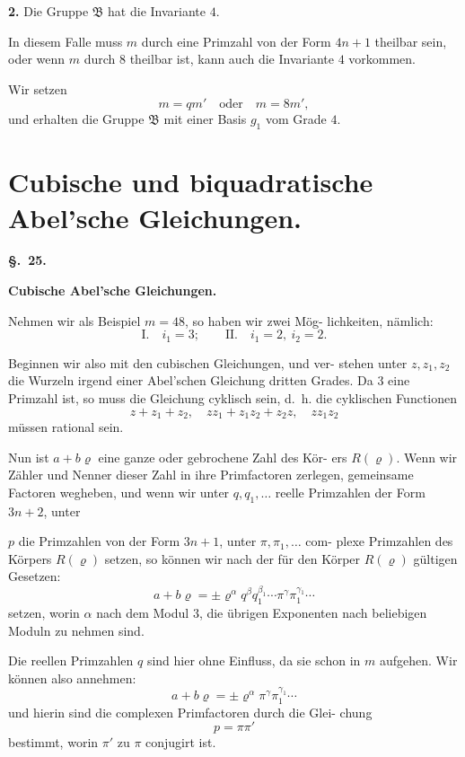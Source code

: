 \documentclass[12pt,a4paper]{article}
\begin{document}
\medskip
\noindent\textbf{2.} Die Gruppe $\mathfrak{B}$ hat die Invariante $4$.

In diesem Falle muss $m$ durch eine Primzahl von der Form
$4n+1$ theilbar sein, oder wenn $m$ durch $8$ theilbar ist,
kann auch die Invariante $4$ vorkommen.

Wir setzen
\[m = qm'\quad \text{oder}\quad m = 8m',\]
und erhalten die Gruppe $\mathfrak{B}$ mit einer Basis $g_1$ vom Grade $4$.

\newpage
\section{Cubische und biquadratische Abel'sche Gleichungen.}
\label{sec:25}

\begin{center}\textbf{\S.~25.}\end{center}
\begin{center}\large\bfseries Cubische Abel'sche Gleichungen.\end{center}

Nehmen wir als Beispiel $m = 48$, so haben wir zwei M\"og-
lichkeiten, n\"amlich:
\[\text{I.}\quad i_1 = 3;\qquad \text{II.}\quad i_1 = 2,\ i_2 = 2.\]

Beginnen wir also mit den cubischen Gleichungen, und ver-
stehen unter $z, z_1, z_2$ die Wurzeln irgend einer Abel'schen
Gleichung dritten Grades. Da $3$ eine Primzahl ist, so muss die
Gleichung cyklisch sein, d.~h. die cyklischen Functionen
\[z + z_1 + z_2,\quad zz_1 + z_1z_2 + z_2z,\quad zz_1z_2\]
m\"ussen rational sein.

Nun ist $a + b\varrho$ eine ganze oder gebrochene Zahl des K\"or-
ers $R(\varrho)$. Wenn wir Z\"ahler und Nenner dieser Zahl in ihre
Primfactoren zerlegen, gemeinsame Factoren wegheben, und wenn
wir unter $q, q_1, \ldots$ reelle Primzahlen der Form $3n+2$, unter

$p$ die Primzahlen von der Form $3n+1$, unter $\pi, \pi_1, \ldots$ com-
plexe Primzahlen des K\"orpers $R(\varrho)$ setzen, so k\"onnen wir nach
der f\"ur den K\"orper $R(\varrho)$ g\"ultigen Gesetzen:
\[a + b\varrho = \pm \varrho^\alpha q^{\beta} q_1^{\beta_1} \cdots \pi^\gamma \pi_1^{\gamma_1} \cdots\]
setzen, worin $\alpha$ nach dem Modul $3$, die \"ubrigen Exponenten nach
beliebigen Moduln zu nehmen sind.

Die reellen Primzahlen $q$ sind hier ohne Einfluss, da sie
schon in $m$ aufgehen. Wir k\"onnen also annehmen:
\[a + b\varrho = \pm \varrho^\alpha \pi^\gamma \pi_1^{\gamma_1} \cdots\]
und hierin sind die complexen Primfactoren durch die Glei-
chung
\[p = \pi \pi'\]
bestimmt, worin $\pi'$ zu $\pi$ conjugirt ist.
\end{document}
